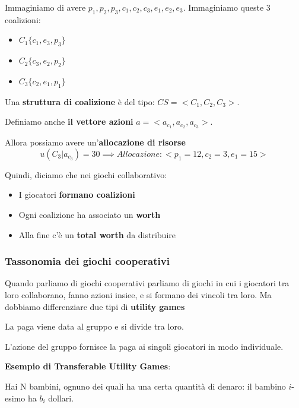 Immaginiamo di avere $p_1, p_2, p_3, c_1,c_2,c_3,e_1,e_2,e_3$. Immaginiamo
queste 3 coalizioni:
\begin{itemize}
    \item $C_1 \{c_1,e_3,p_3\}$
    \item $C_2 \{c_3,e_2,p_2\}$
    \item $C_3 \{c_2,e_1,p_1\}$
\end{itemize}
Una \textbf{struttura di coalizione} è del tipo: $CS = <C_1, C_2, C_3>$.

Definiamo anche \textbf{il vettore azioni} $a = <a_{c_1}, a_{c_2}, a_{c_3}>$.

Allora possiamo avere un'\textbf{allocazione di risorse}
\begin{equation}
    u(C_3|a_{c_3})=30 \implies Allocazione:<p_1=12,c_2=3,e_1=15>
\end{equation}

Quindi, diciamo che nei giochi collaborativo:
\begin{itemize}
    \item I giocatori \textbf{formano coalizioni}
    \item Ogni coalizione ha associato un \textbf{worth}
    \item Alla fine c'è un \textbf{total worth} da distribuire
\end{itemize}
\subsubsection{Tassonomia dei giochi cooperativi}

Quando parliamo di giochi cooperativi parliamo di giochi in cui i giocatori tra
loro collaborano, fanno azioni insiee, e si formano dei vincoli tra loro. Ma
dobbiamo differenziare due tipi di \textbf{utility games}

\begin{definition}
    La paga viene data al gruppo e si divide tra loro.
\end{definition}

\begin{definition}
    L'azione del gruppo fornisce la paga ai singoli giocatori in modo individuale.
\end{definition}

\textbf{Esempio di Transferable Utility Games}:

Hai N bambini, ognuno dei quali ha una certa quantità di denaro: il bambino
$i$-esimo ha $b_i$ dollari.

